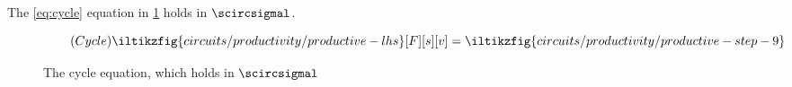 \begin{theorem}
    The \eqref{eq:cycle} equation in \cref{fig:cycle} holds in \(\scircsigmal\).
\end{theorem}

\begin{figure*}
    \centering
    \begin{equation*}
        \tag{\(\mathsf{Cycle}\)}
        \iltikzfig{circuits/productivity/productive-lhs}[F][s][v]
        =
        \iltikzfig{circuits/productivity/productive-step-9}
        \label{eq:cycle}
    \end{equation*}
    \caption{The cycle equation, which holds in \(\scircsigmal\)}
    \label{fig:cycle}
\end{figure*}